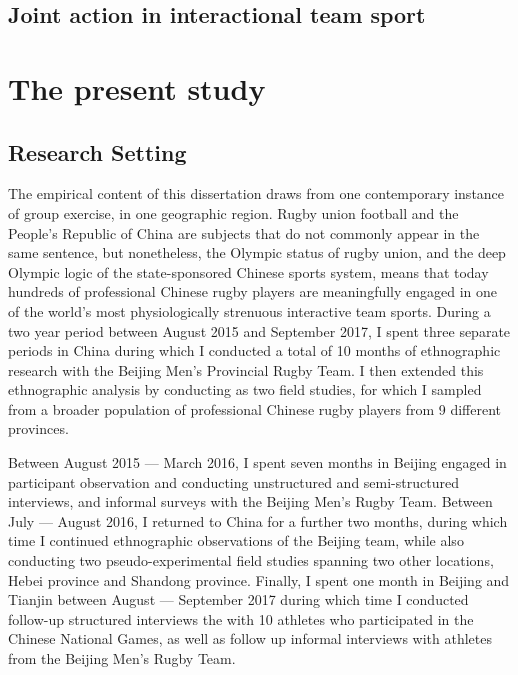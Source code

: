 









\subsection{Joint action in interactional team sport}












\section{The present study}

      \subsection{Research Setting}
      The empirical content of this dissertation draws from one contemporary instance of group exercise, in one geographic region.  Rugby union football and the People's Republic of China are subjects that do not commonly appear in the same sentence, but nonetheless, the Olympic status of rugby union, and the deep Olympic logic of the state-sponsored Chinese sports system, means that today hundreds of professional Chinese rugby players are meaningfully engaged in one of the world's most physiologically strenuous interactive team sports.  During a two year period between August 2015 and September 2017, I spent three separate periods in China during which I conducted a total of 10 months of ethnographic research with the Beijing Men's Provincial Rugby Team. I then extended this ethnographic analysis by conducting as two field studies, for which I sampled from a broader population of professional Chinese rugby players from 9 different provinces.

      Between August 2015 --- March 2016, I spent seven months in Beijing engaged in participant observation and conducting unstructured and semi-structured interviews, and informal surveys with the Beijing Men's Rugby Team. Between July --- August 2016, I returned to China for a further two months, during which time I continued ethnographic observations of the Beijing team, while also conducting two pseudo-experimental field studies spanning two other locations, Hebei province and Shandong province. Finally, I spent one month in Beijing and Tianjin between August --- September 2017 during which time I conducted follow-up structured interviews the with 10 athletes who participated in the Chinese National Games, as well as follow up informal interviews with athletes from the Beijing Men's Rugby Team.

